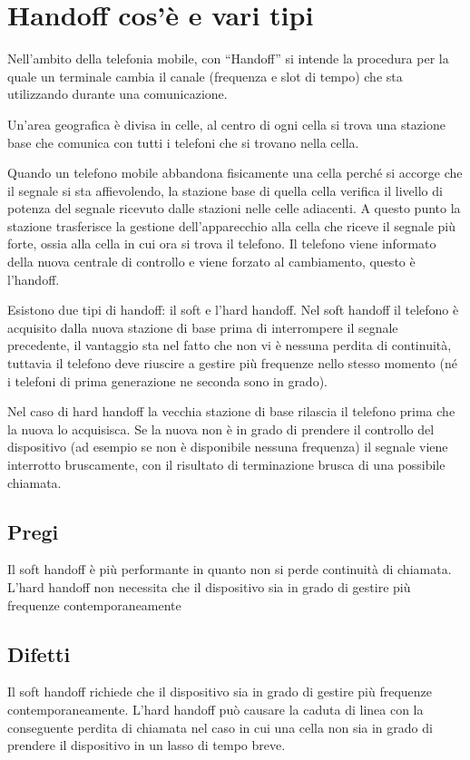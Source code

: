 \section{Handoff cos'è e vari tipi}

Nell'ambito della telefonia mobile, con “Handoff” si intende la procedura per la quale un terminale cambia il canale (frequenza e slot di tempo) che sta utilizzando durante una comunicazione.

Un'area geografica è divisa in celle, al centro di ogni cella si trova una stazione base che comunica con tutti i telefoni che si trovano nella cella.

Quando un telefono mobile abbandona fisicamente una cella perché si accorge che il segnale si sta affievolendo, la stazione base di quella cella verifica il livello di potenza del segnale ricevuto dalle stazioni nelle celle adiacenti. A questo punto la stazione trasferisce la gestione dell'apparecchio alla cella che riceve il segnale più forte, ossia alla cella in cui ora si trova il telefono.
Il telefono viene informato della nuova centrale di controllo e viene forzato al cambiamento, questo è l'handoff.

Esistono due tipi di handoff: il soft e l'hard handoff. Nel soft handoff il telefono è acquisito dalla nuova stazione di base prima di interrompere il segnale precedente, il vantaggio sta nel fatto che non vi è nessuna perdita di continuità, tuttavia il telefono deve riuscire a gestire più frequenze nello stesso momento (né i telefoni di prima generazione ne seconda sono in grado).

Nel caso di hard handoff la vecchia stazione di base rilascia il telefono prima che la nuova lo acquisisca. Se la nuova non è in grado di prendere il controllo del dispositivo (ad esempio se non è disponibile nessuna frequenza) il segnale viene interrotto bruscamente, con il risultato di terminazione brusca di una possibile chiamata.
\subsection{Pregi}
Il soft handoff è più performante in quanto non si perde continuità di chiamata.
L'hard handoff non necessita che il dispositivo sia in grado di gestire più frequenze contemporaneamente
\subsection{Difetti}
Il soft handoff richiede che il dispositivo sia in grado di gestire più frequenze contemporaneamente.
L'hard handoff può causare la caduta di linea con la conseguente perdita di chiamata nel caso in cui una cella non sia in grado di prendere il dispositivo in un lasso di tempo breve.
